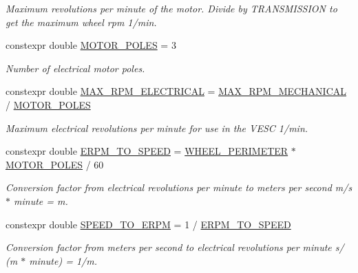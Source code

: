 \begin{DoxyCompactItemize}
\begin{DoxyCompactList}\small\item\em Maximum revolutions per minute of the motor. Divide by T\+R\+A\+N\+S\+M\+I\+S\+S\+I\+ON to get the maximum wheel rpm  1/min. \end{DoxyCompactList}\item 
constexpr double \hyperlink{namespacecar__config_a611a0f02cf52db1d438a2dd53b642cd5}{M\+O\+T\+O\+R\+\_\+\+P\+O\+L\+ES} = 3
\begin{DoxyCompactList}\small\item\em Number of electrical motor poles. \end{DoxyCompactList}\item 
constexpr double \hyperlink{namespacecar__config_aaf4d6a90e2b9c983b0b0d29a584c399b}{M\+A\+X\+\_\+\+R\+P\+M\+\_\+\+E\+L\+E\+C\+T\+R\+I\+C\+AL} = \hyperlink{namespacecar__config_ad35069a183782259c6280aa219b72ffa}{M\+A\+X\+\_\+\+R\+P\+M\+\_\+\+M\+E\+C\+H\+A\+N\+I\+C\+AL} / \hyperlink{namespacecar__config_a611a0f02cf52db1d438a2dd53b642cd5}{M\+O\+T\+O\+R\+\_\+\+P\+O\+L\+ES}
\begin{DoxyCompactList}\small\item\em Maximum electrical revolutions per minute for use in the V\+E\+SC  1/min. \end{DoxyCompactList}\item 
constexpr double \hyperlink{namespacecar__config_af33b95798967e7193927782fd91d36ce}{E\+R\+P\+M\+\_\+\+T\+O\+\_\+\+S\+P\+E\+ED} = \hyperlink{namespacecar__config_a46fe00906da07d2e030b586a634cd907}{W\+H\+E\+E\+L\+\_\+\+P\+E\+R\+I\+M\+E\+T\+ER} $\ast$ \hyperlink{namespacecar__config_a611a0f02cf52db1d438a2dd53b642cd5}{M\+O\+T\+O\+R\+\_\+\+P\+O\+L\+ES} / 60
\begin{DoxyCompactList}\small\item\em Conversion factor from electrical revolutions per minute to meters per second  m/s $\ast$ minute = m. \end{DoxyCompactList}\item 
constexpr double \hyperlink{namespacecar__config_a0f37aa7e52366aebb006c6e1d3317900}{S\+P\+E\+E\+D\+\_\+\+T\+O\+\_\+\+E\+R\+PM} = 1 / \hyperlink{namespacecar__config_af33b95798967e7193927782fd91d36ce}{E\+R\+P\+M\+\_\+\+T\+O\+\_\+\+S\+P\+E\+ED}
\begin{DoxyCompactList}\small\item\em Conversion factor from meters per second to electrical revolutions per minute  s/ (m $\ast$ minute) = 1/m. \end{DoxyCompactList}\item 

\end{DoxyCompactItemize}
